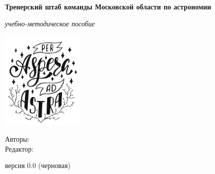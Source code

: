 \documentclass[../main.tex]{subfiles}
\begin{document}
\begin{titlepage}
	\clearpage\thispagestyle{empty}
	\centering
	
	\textbf{Тренерский штаб команды Московской области по астрономии}
	\vspace{30ex}
	
	{\textbf{\FullCourseNameFirstPart}}
	
	\vspace{1ex}
	\emph{учебно-методическое пособие}
	
	
	\includegraphics[width=0.3\textwidth]{images/logo.png}

	\begin{flushright}
		\noindent
		Авторы: \href{https://t.me/MuratVasiliev}{\textit{\LecturerInitials}}\\ 
		Редактор: \href{https://t.me/NoblFriend}{\textit{\EditorInitials}}
	\end{flushright}
	
	\vfill

	{\color{red}версия 0.0 (черновая)}

	\CourseDate%
	\pagebreak
\end{titlepage}
\end{document}
